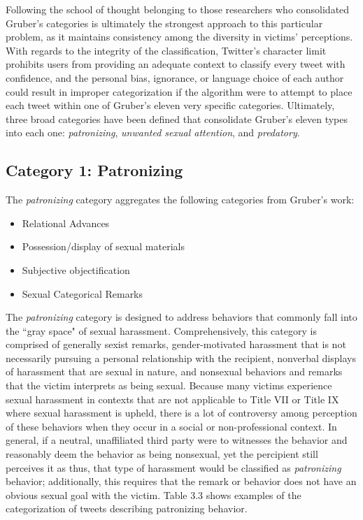 Following the school of thought belonging to those researchers who consolidated Gruber's categories is ultimately the strongest approach to this particular problem, as it maintains consistency among the diversity in victims' perceptions. With regards to the integrity of the classification, Twitter's character limit prohibits users from providing an adequate context to classify every tweet with confidence, and the personal bias, ignorance, or language choice of each author could result in improper categorization if the algorithm were to attempt to place each tweet within one of Gruber's eleven very specific categories. Ultimately, three broad categories have been defined that consolidate Gruber's eleven types into each one: \textit{patronizing}, \textit{unwanted sexual attention}, and \textit{predatory}.

\subsection{Category 1: Patronizing}

The \textit{patronizing} category aggregates the following categories from Gruber's work:

\begin{itemize}
  \item Relational Advances
  \item Possession/display of sexual materials
  \item Subjective objectification
  \item Sexual Categorical Remarks
\end{itemize}

The \textit{patronizing} category is designed to address behaviors that commonly fall into the ``gray space" of sexual harassment. Comprehensively, this category is comprised of generally sexist remarks, gender-motivated harassment that is not necessarily pursuing a personal relationship with the recipient, nonverbal displays of harassment that are sexual in nature, and nonsexual behaviors and remarks that the victim interprets as being sexual. Because many victims experience sexual harassment in contexts that are not applicable to Title VII or Title IX where sexual harassment is upheld, there is a lot of controversy among perception of these behaviors when they occur in a social or non-professional context. In general, if a neutral, unaffiliated third party were to witnesses the behavior and reasonably deem the behavior as being nonsexual, yet the percipient still perceives it as thus, that type of harassment would be classified as \textit{patronizing} behavior; additionally, this requires that the remark or behavior does not have an obvious sexual goal with the victim. Table 3.3 shows examples of the categorization of tweets describing patronizing behavior.


